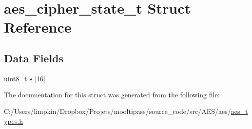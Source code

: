 \hypertarget{structaes__cipher__state__t}{\section{aes\+\_\+cipher\+\_\+state\+\_\+t Struct Reference}
\label{structaes__cipher__state__t}
}
\subsection*{Data Fields}
\begin{DoxyCompactItemize}
\item 
\hypertarget{structaes__cipher__state__t_ae9267f97d76009b78c1502fc433d0f97}{uint8\+\_\+t {\bfseries s} \mbox{[}16\mbox{]}}\label{structaes__cipher__state__t_ae9267f97d76009b78c1502fc433d0f97}

\end{DoxyCompactItemize}


The documentation for this struct was generated from the following file\+:\begin{DoxyCompactItemize}
\item 
C\+:/\+Users/limpkin/\+Dropbox/\+Projets/mooltipass/source\+\_\+code/src/\+A\+E\+S/aes/\hyperlink{aes__types_8h}{aes\+\_\+types.\+h}\end{DoxyCompactItemize}
